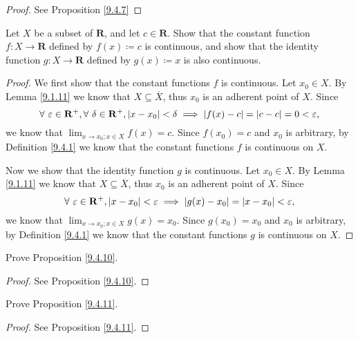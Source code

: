 \begin{proof}
    See Proposition \ref{9.4.7}
\end{proof}

\begin{exercise}\label{ex 9.4.2}
    Let \(X\) be a subset of \(\mathbf{R}\), and let \(c \in \mathbf{R}\).
    Show that the constant function \(f : X \to \mathbf{R}\) defined by \(f(x) \coloneqq c\) is continuous, and show that the identity function \(g : X \to \mathbf{R}\) defined by \(g(x) \coloneqq x\) is also continuous.
\end{exercise}

\begin{proof}
    We first show that the constant functions \(f\) is continuous.
    Let \(x_0 \in X\).
    By Lemma \ref{9.1.11} we know that \(X \subseteq \overline{X}\), thus \(x_0\) is an adherent point of \(X\).
    Since
    \[
        \forall\ \varepsilon \in \mathbf{R}^+, \forall\ \delta \in \mathbf{R}^+, \abs*{x - x_0} < \delta \implies \abs*{f(x) - c} = \abs*{c - c} = 0 < \varepsilon,
    \]
    we know that \(\lim_{x \to x_0 ; x \in X} f(x) = c\).
    Since \(f(x_0) = c\) and \(x_0\) is arbitrary, by Definition \ref{9.4.1} we know that the constant functions \(f\) is continuous on \(X\).

    Now we show that the identity function \(g\) is continuous.
    Let \(x_0 \in X\).
    By Lemma \ref{9.1.11} we know that \(X \subseteq \overline{X}\), thus \(x_0\) is an adherent point of \(X\).
    Since
    \[
        \forall\ \varepsilon \in \mathbf{R}^+, \abs*{x - x_0} < \varepsilon \implies \abs*{g(x) - x_0} = \abs*{x - x_0} < \varepsilon,
    \]
    we know that \(\lim_{x \to x_0 ; x \in X} g(x) = x_0\).
    Since \(g(x_0) = x_0\) and \(x_0\) is arbitrary, by Definition \ref{9.4.1} we know that the constant functions \(g\) is continuous on \(X\).
\end{proof}

\begin{exercise}\label{ex 9.4.3}
    Prove Proposition \ref{9.4.10}.
\end{exercise}

\begin{proof}
    See Proposition \ref{9.4.10}.
\end{proof}

\begin{exercise}\label{ex 9.4.4}
    Prove Proposition \ref{9.4.11}.
\end{exercise}

\begin{proof}
    See Proposition \ref{9.4.11}.
\end{proof}


